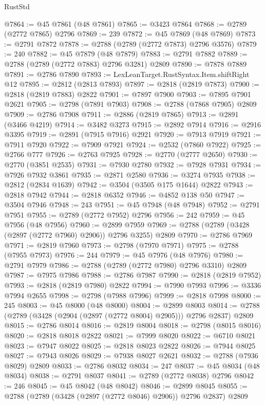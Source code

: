 \begin{lexlean}{RustStd}
\begin{coremodule}
@7864 := @45 @7861 (@48 @7861)
@7865 := @3423 @7864
@7868 := @2789 (@2772 @7865) @2796
@7869 := 239
@7872 := @45 @7869 (@48 @7869)
@7873 := @2791 @7872
@7878 := @2788 (@2789 (@2772 @7873) @2796 @3576)
@7879 := 240
@7882 := @45 @7879 (@48 @7879)
@7883 := @2791 @7882
@7889 := @2788 (@2789 (@2772 @7883) @2796 @3281) @2809
@7890 := @7878 @7889
@7891 := @2786 @7890
@7893 := LexLeanTarget.RustSyntax.Item.shiftRight @12
@7895 := @2812 (@2813 @7893)
@7897 := @2818 (@2819 @7873)
@7900 := @2818 (@2819 @7883) @2822
@7901 := @7897 @7900
@7903 := @7895 @7901 @2621
@7905 := @2798 (@7891 @7903)
@7908 := @2788 (@7868 @7905) @2809
@7909 := @2786 @7908
@7911 := @2886 (@2819 @7865)
@7913 := @2891 (@3466 @4219)
@7914 := @3482 @3273
@7915 := @2892 @7914
@7916 := @2916 @3395
@7919 := @2891 (@7915 @7916) @2921
@7920 := @7913 @7919
@7921 := @7911 @7920
@7922 := @7909 @7921
@7924 := @2532 (@7860 @7922)
@7925 := @2766 @777
@7926 := @2763 @7925
@7928 := @2770 (@2777 @2650)
@7930 := @2770 (@3851 @2535)
@7931 := @7930 @2780
@7932 := @7928 @7931
@7934 := @7926 @7932 @3861
@7935 := @2871 @2580
@7936 := @3274 @7935
@7938 := @2812 (@2834 @1639)
@7942 := @3504 (@3505 @175 @1644) @2822
@7943 := @2818 @7942
@7944 := @2818 @6352
@7946 := @4852 @138 @50
@7947 := @3504 @7946
@7948 := 243
@7951 := @45 @7948 (@48 @7948)
@7952 := @2791 @7951
@7955 := @2789 (@2772 @7952) @2796
@7956 := 242
@7959 := @45 @7956 (@48 @7956)
@7960 := @2899 @7959
@7969 := @2788 (@2789 (@3428 (@2897 (@2772 @7960) @2906)) @2796 @3255) @2809
@7970 := @2786 @7969
@7971 := @2819 @7960
@7973 := @2798 (@7970 @7971)
@7975 := @2788 (@7955 @7973)
@7976 := 244
@7979 := @45 @7976 (@48 @7976)
@7980 := @2791 @7979
@7986 := @2788 (@2789 (@2772 @7980) @2796 @3310) @2809
@7987 := @7975 @7986
@7988 := @2786 @7987
@7990 := @2818 (@2819 @7952)
@7993 := @2818 (@2819 @7980) @2822
@7994 := @7990 @7993
@7996 := @3336 @7994 @2655
@7998 := @2798 (@7988 @7996)
@7999 := @2818 @7998
@8000 := 245
@8003 := @45 @8000 (@48 @8000)
@8004 := @2899 @8003
@8014 := @2788 (@2789 (@3428 (@2904 (@2897 (@2772 @8004) @2905))) @2796 @2837) @2809
@8015 := @2786 @8014
@8016 := @2819 @8004
@8018 := @2798 (@8015 @8016)
@8020 := @2818 @8018 @2822
@8021 := @7999 @8020
@8022 := @6710 @8021
@8023 := @7947 @8022
@8025 := @2818 @8023 @2822
@8026 := @7944 @8025
@8027 := @7943 @8026
@8029 := @7938 @8027 @2621
@8032 := @2788 (@7936 @8029) @2809
@8033 := @2786 @8032
@8034 := 247
@8037 := @45 @8034 (@48 @8034)
@8038 := @2791 @8037
@8041 := @2789 (@2772 @8038) @2796
@8042 := 246
@8045 := @45 @8042 (@48 @8042)
@8046 := @2899 @8045
@8055 := @2788 (@2789 (@3428 (@2897 (@2772 @8046) @2906)) @2796 @2837) @2809

\end{coremodule}
\end{lexlean}
